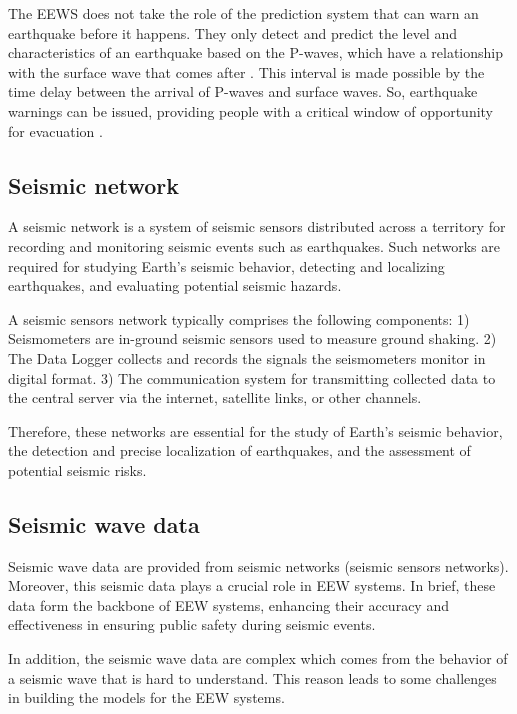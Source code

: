 The EEWS does not take the role of the prediction system that can warn an earthquake before it happens. They only detect and predict the level and characteristics of an earthquake based on the P-waves, which have a relationship with the surface wave that comes after \cite{chiang2022neural, jozinovic2020rapid, li2018machine}. This interval is made possible by the time delay between the arrival of P-waves and surface waves. So, earthquake warnings can be issued, providing people with a critical window of opportunity for evacuation \cite{gasparini2007earthquake}.

\subsection{Seismic network}
A seismic network is a system of seismic sensors distributed across a territory for recording and monitoring seismic events such as earthquakes. Such networks are required for studying Earth's seismic behavior, detecting and localizing earthquakes, and evaluating potential seismic hazards\cite{gasparini2007earthquake}. 

A seismic sensors network typically comprises the following components: 1) Seismometers are in-ground seismic sensors used to measure ground shaking\cite{wu2021crowdquake+}. 2) The Data Logger collects and records the signals the seismometers monitor in digital format\cite{chiang2022neural, jozinovic2020rapid}. 3) The communication system for transmitting collected data to the central server via the internet, satellite links, or other channels\cite{gasparini2007earthquake}. 

Therefore, these networks are essential for the study of Earth's seismic behavior, the detection and precise localization of earthquakes, and the assessment of potential seismic risks.

\subsection{Seismic wave data}
Seismic wave data are provided from seismic networks (seismic sensors networks). Moreover, this seismic data plays a crucial role in EEW systems. In brief, these data form the backbone of EEW systems, enhancing their accuracy and effectiveness in ensuring public safety during seismic events.

In addition, the seismic wave data are complex which comes from the behavior of a seismic wave that is hard to understand. This reason leads to some challenges in building the models for the EEW systems.

